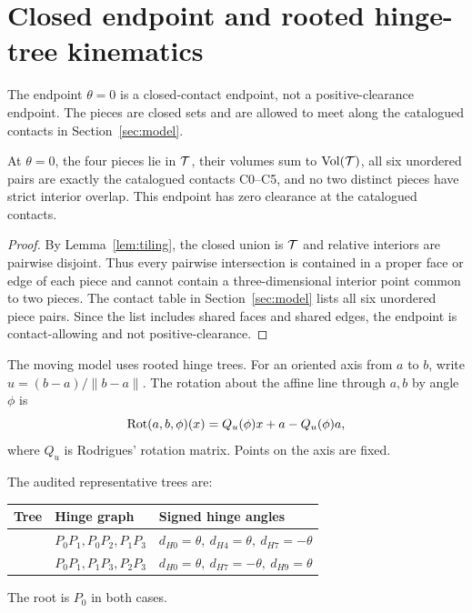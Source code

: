\section{Closed endpoint and rooted hinge-tree kinematics}
\label{sec:endpoint}

The endpoint \(\theta=0\) is a closed-contact endpoint, not a positive-clearance
endpoint.  The pieces are closed sets and are allowed to meet along the
catalogued contacts in Section~\ref{sec:model}.

\begin{lemma}
\label{lem:endpoint}
At \(\theta=0\), the four pieces lie in \(\mathcal T\), their volumes sum to
\(\operatorname{Vol}(\mathcal T)\), all six unordered pairs are exactly the catalogued contacts C0--C5,
and no two distinct pieces have strict interior overlap.  This endpoint has
zero clearance at the catalogued contacts.
\end{lemma}

\begin{proof}
By Lemma~\ref{lem:tiling}, the closed union is \(\mathcal T\) and relative interiors
are pairwise disjoint.  Thus every pairwise intersection is contained in a
proper face or edge of each piece and cannot contain a three-dimensional
interior point common to two pieces.  The contact table in Section~\ref{sec:model}
lists all six unordered piece pairs.  Since the list includes shared faces and
shared edges, the endpoint is contact-allowing and not positive-clearance.
\end{proof}

The moving model uses rooted hinge trees.  For an oriented axis from \(a\) to
\(b\), write \(u=(b-a)/\lVert b-a\rVert\).  The rotation about the affine line
through \(a,b\) by angle \(\phi\) is
\[
\operatorname{Rot}(a,b,\phi)(x)=Q_u(\phi)x+a-Q_u(\phi)a,
\]
where \(Q_u\) is Rodrigues' rotation matrix.  Points on the axis are fixed.

The audited representative trees are:
\begin{center}
\begin{tabular}{lll}
\toprule
Tree & Hinge graph & Signed hinge angles\\
\midrule
\treeA{} & \(P_0P_1, P_0P_2, P_1P_3\) &
\(d_{H0}=\theta,\ d_{H4}=\theta,\ d_{H7}=-\theta\)\\
\treeB{} & \(P_0P_1, P_1P_3, P_2P_3\) &
\(d_{H0}=\theta,\ d_{H7}=-\theta,\ d_{H9}=\theta\)\\
\bottomrule
\end{tabular}
\end{center}
The root is \(P_0\) in both cases.

